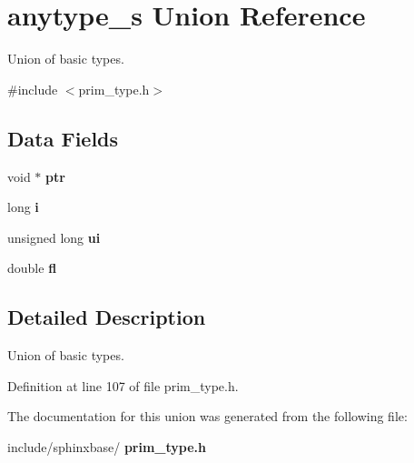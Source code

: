 \section{anytype\+\_\+s Union Reference}
\label{unionanytype__s}


Union of basic types.  




{\ttfamily \#include $<$prim\+\_\+type.\+h$>$}

\subsection*{Data Fields}
\begin{DoxyCompactItemize}
\item 
\mbox{\label{unionanytype__s_ad06e5319b02ebff60fd00113baad6cf6}} 
void $\ast$ {\bfseries ptr}
\item 
\mbox{\label{unionanytype__s_a34ab20b326601115a718ed1ada34640f}} 
long {\bfseries i}
\item 
\mbox{\label{unionanytype__s_a702ec3b3f98e1364ce475cd5c0d3b619}} 
unsigned long {\bfseries ui}
\item 
\mbox{\label{unionanytype__s_aa819b7996e6d9530340be88e0d218590}} 
double {\bfseries fl}
\end{DoxyCompactItemize}


\subsection{Detailed Description}
Union of basic types. 

Definition at line 107 of file prim\+\_\+type.\+h.



The documentation for this union was generated from the following file\+:\begin{DoxyCompactItemize}
\item 
include/sphinxbase/\textbf{ prim\+\_\+type.\+h}\end{DoxyCompactItemize}
